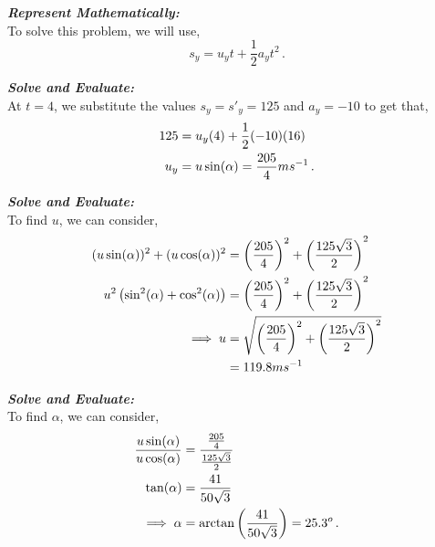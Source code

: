 \begin{subquestions}
\begin{subsubquestions}

\subsubquestion

\textbf{\textit{Represent Mathematically:}} \\
To solve this problem, we will use,
\begin{equation}
	s_y = u_yt + \frac{1}{2}a_yt^2 \,.
\end{equation}




\textbf{\textit{Solve and Evaluate:}} \\
At $t=4$, we substitute the values $s_y={s'}_y=125$ and $a_y=-10$ to get that,
\begin{align}
	125 & = u_y(4) + \frac{1}{2}(-10)(16) \nonumber \\
	u_y & = u\sin(\alpha) = \frac{205}{4}ms^{-1} \,.
\end{align}


\subsubquestion

\textbf{\textit{Solve and Evaluate:}} \\
To find $u$, we can consider,
\begin{align}
	(u\sin(\alpha))^2 + (u\cos(\alpha))^2 & = \left(\frac{205}{4}\right)^2 + \left(\frac{125\sqrt{3}}{2}\right)^2 \nonumber \\
	 u^2\left(\sin^2(\alpha)+\cos^2(\alpha)\right) & = \left(\frac{205}{4}\right)^2 + \left(\frac{125\sqrt{3}}{2}\right)^2 \nonumber \\
	 \implies u & = \sqrt{\left(\frac{205}{4}\right)^2 + \left(\frac{125\sqrt{3}}{2}\right)^2} \nonumber \\
	            & = 119.8ms^{-1}
\end{align}


\subsubquestion

\textbf{\textit{Solve and Evaluate:}} \\
To find $\alpha$, we can consider,
\begin{align}
	\frac{u\sin(\alpha)}{u\cos(\alpha)} & = \frac{\frac{205}{4}}{\frac{125\sqrt{3}}{2}} \nonumber \\
	\tan(\alpha) & = \frac{41}{50\sqrt{3}} \nonumber \\
	\implies \alpha & = \arctan\left(\frac{41}{50\sqrt{3}}\right) = 25.3^o \,.
\end{align}
	
\end{subsubquestions}

\end{subquestions}
	